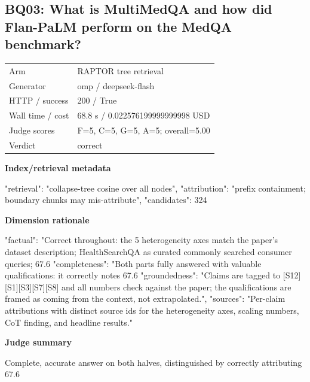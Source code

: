 \documentclass[10pt]{article}
\begin{document}
\subsection{BQ03: What is MultiMedQA and how did Flan-PaLM perform on the MedQA benchmark?}
\begin{tabular}{@{}ll@{}}
Arm & RAPTOR tree retrieval\\
Generator & omp / deepseek-flash\\
HTTP / success & 200 / True\\
Wall time / cost & 68.8 s / 0.022576199999999998 USD\\
Judge scores & F=5, C=5, G=5, A=5; overall=5.00\\
Verdict & correct\\
\end{tabular}

\textbf{Index/retrieval metadata}
\begin{EvidenceText}
{
  "retrieval": "collapse-tree cosine over all nodes",
  "attribution": "prefix containment; boundary chunks may mis-attribute",
  "candidates": 324
}
\end{EvidenceText}

\textbf{Dimension rationale}
\begin{EvidenceText}
{
  "factual": "Correct throughout: the 5 heterogeneity axes match the paper's dataset description; HealthSearchQA as curated commonly searched consumer queries; 67.6%
  "completeness": "Both parts fully answered with valuable qualifications: it correctly notes 67.6%
  "groundedness": "Claims are tagged to [S12][S1][S3][S7][S8] and all numbers check against the paper; the qualifications are framed as coming from the context, not extrapolated.",
  "sources": "Per-claim attributions with distinct source ids for the heterogeneity axes, scaling numbers, CoT finding, and headline results."
}
\end{EvidenceText}

\textbf{Judge summary}
\begin{EvidenceText}
Complete, accurate answer on both halves, distinguished by correctly attributing 67.6%
\end{EvidenceText}
\end{document}
